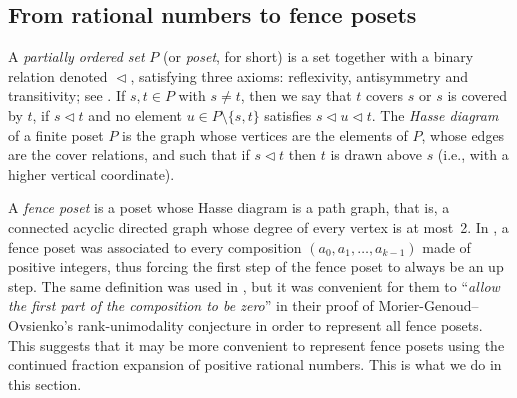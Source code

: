 \documentclass[a4paper,12pt]{amsart}
\newcommand{\0}{\mathtt{0}}
\newcommand{\1}{\mathtt{1}}
\newcommand{\2}{\mathtt{2}}
\newcommand{\3}{\mathtt{3}}
\begin{document}
\subsection{From rational numbers to fence posets}\label{sec:rational-to-fence-poset}

A \emph{partially ordered set} $P$ (or \emph{poset}, for short)
is a set together with a binary relation denoted $\vartriangleleft$,
satisfying three axioms: reflexivity, antisymmetry and transitivity;
see \cite{MR2868112}.
If $s,t\in P$ with $s\neq t$, then we say that $t$ covers $s$ or $s$ is covered by $t$,
if $s\vartriangleleft t$ and
no element $u\in P\setminus\{s,t\}$ satisfies $s \vartriangleleft u \vartriangleleft t$.
%
The \emph{Hasse diagram}
of a finite poset $P$ is the graph whose vertices are the elements of $P$, whose edges are the
cover relations, and such that if $s \vartriangleleft t$ then $t$ is drawn above $s$
(i.e., with a higher vertical coordinate).

A \emph{fence poset} is a poset whose Hasse diagram is a path graph,
that is, a connected acyclic directed graph whose degree of every vertex is at
most~2.
In \cite{MR4266256}, a fence poset was associated
to every composition $(a_0,a_1,\dots,a_{k-1})$ made of positive integers,
thus forcing the first step of the fence poset to always be an up step.
The same definition was used in \cite{MR4499341},
but it was convenient for them to
``\textit{allow the first part of the composition to be zero}''
in their proof of Morier-Genoud--Ovsienko's rank-unimodality conjecture
in order to represent all fence posets.
This suggests that it may be more convenient to represent fence posets
using the continued fraction expansion of
positive rational numbers.
This is what we do in this section.
\end{document}
